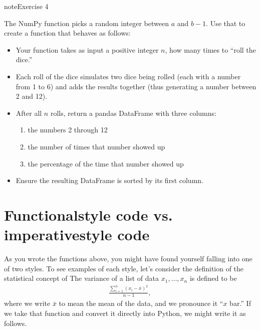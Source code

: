 \documentclass[letterpaper,10pt,english]{jupyterBook}
\begin{document}
\begin{sphinxadmonition}{note}{Exercise 4}

\sphinxAtStartPar
The NumPy function  picks a random integer between \(a\) and \(b-1\).  Use that to create a function that behaves as follows:
\begin{itemize}
\item {} 
\sphinxAtStartPar
Your function takes as input a positive integer \(n\), how many times to “roll the dice.”

\item {} 
\sphinxAtStartPar
Each roll of the dice simulates two dice being rolled (each with a number from 1 to 6) and adds the results together (thus generating a number between 2 and 12).

\item {} 
\sphinxAtStartPar
After all \(n\) rolls, return a pandas DataFrame with three columns:
\begin{enumerate}
%
\item {} 
\sphinxAtStartPar
the numbers 2 through 12

\item {} 
\sphinxAtStartPar
the number of times that number showed up

\item {} 
\sphinxAtStartPar
the percentage of the time that number showed up

\end{enumerate}

\item {} 
\sphinxAtStartPar
Ensure the resulting DataFrame is sorted by its first column.

\end{itemize}
\end{sphinxadmonition}


\section{Functional\sphinxhyphen{}style code vs. imperative\sphinxhyphen{}style code}
\label{\detokenize{chapter-4-review-of-python-and-pandas:functional-style-code-vs-imperative-style-code}}
\sphinxAtStartPar
As you wrote the functions above, you might have found yourself falling into one of two styles.  To see examples of each style, let’s consider the definition of the statistical concept of   The variance of a list of data \(x_1,\ldots,x_n\) is defined to be
\begin{equation*}
\begin{split}\frac{\sum_{i=1}^{n} (x_i-\bar{x})^2}{n-1},\end{split}
\end{equation*}
\sphinxAtStartPar
where we write \(\bar{x}\) to mean the mean of the data, and we pronounce it “\(x\) bar.”  If we take that function and convert it directly into Python, we might write it as follows.
\end{document}
